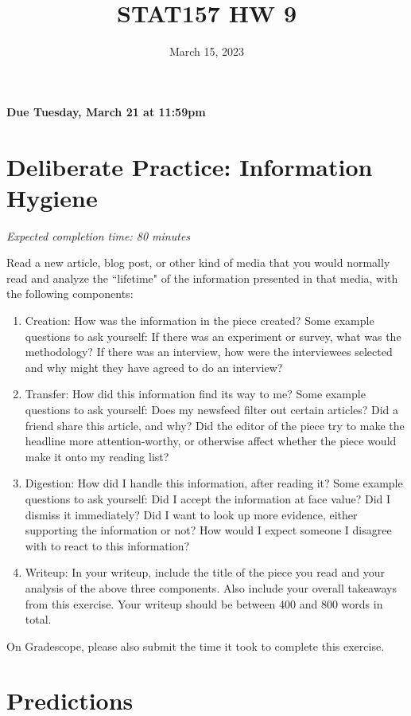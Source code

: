 \documentclass[11pt]{article}
\title{STAT157 HW 9}
\date{March 15, 2023}
\begin{document}
\maketitle

\hfill \textbf{Due Tuesday, March 21 at 11:59pm}




\section*{Deliberate Practice: Information Hygiene}

\emph{Expected completion time: 80 minutes}

Read a new article, blog post, or other kind of media that you would normally read and analyze the ``lifetime" of the information presented in that media, with the following components:
\begin{enumerate}
	\item Creation: How was the information in the piece created? Some example questions to ask yourself: If there was an experiment or survey, what was the methodology? If there was an interview, how were the interviewees selected and why might they have agreed to do an interview? 
	\item Transfer: How did this information find its way to me? Some example questions to ask yourself: Does my newsfeed filter out certain articles? Did a friend share this article, and why? Did the editor of the piece try to make the headline more attention-worthy, or otherwise affect whether the piece would make it onto my reading list?
	\item Digestion: How did I handle this information, after reading it? Some example questions to ask yourself: Did I accept the information at face value? Did I dismiss it immediately? Did I want to look up more evidence, either supporting the information or not? How would I expect someone I disagree with to react to this information?
	\item Writeup: In your writeup, include the title of the piece you read and your analysis of the above three components. Also include your overall takeaways from this exercise. Your writeup should be between 400 and 800 words in total.
\end{enumerate}

On Gradescope, please also submit the time it took to complete this exercise.


\section*{Predictions}
\end{document}

